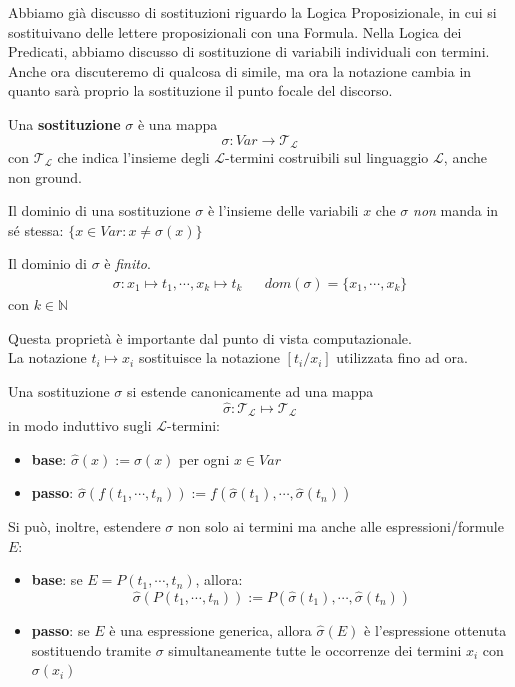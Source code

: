 Abbiamo già discusso di sostituzioni riguardo la Logica Proposizionale, in cui 
si sostituivano delle lettere proposizionali con una Formula. Nella Logica dei Predicati, 
abbiamo discusso di sostituzione di variabili individuali con termini. Anche 
ora discuteremo di qualcosa di simile, ma ora la notazione cambia in quanto 
sarà proprio la sostituzione il punto focale del discorso. 

\begin{defi}[Sostituzione]
Una \textbf{sostituzione} $\sigma$ è una mappa 
$$
\sigma: Var \rightarrow \mathscr{T_L}
$$
con $\mathscr{T_L}$ che indica l'insieme degli $\mathscr{L}$-termini costruibili sul linguaggio $\mathscr{L}$, anche non ground. \
\end{defi}
\begin{defi}
Il dominio di una sostituzione $\sigma$ è l'insieme delle variabili $x$ che $\sigma$ \textit{non} manda in sé stessa: $\{x \in Var : x \neq \sigma(x)\}$
\end{defi}
\begin{pro}
Il dominio di $\sigma$ è \textit{finito}.
\begin{align*}
\sigma: x_1 \mapsto t_1, \cdots, x_k \mapsto t_k &&
dom(\sigma) = \{x_1, \cdots, x_k\}
\end{align*}
con $k \in \mathbb{N}$
\end{pro}
\noindent
Questa proprietà è importante dal punto di vista computazionale. \\
La notazione $t_i \mapsto x_i$ sostituisce la notazione $[t_i/x_i]$ utilizzata fino ad ora. 

\begin{defi}
Una sostituzione $\sigma$ si estende canonicamente ad una mappa 
$$
\hat{\sigma}: \mathscr{T_L} \mapsto \mathscr{T_L}
$$
in modo induttivo sugli $\mathscr{L}$-termini:
\begin{itemize}
  \item \textbf{base}: $\hat{\sigma}(x) := \sigma(x)$ per ogni $x \in Var$
  \item \textbf{passo}: $\hat{\sigma}(f(t_1, \cdots, t_n)) := f(\hat{\sigma}(t_1), \cdots, \hat{\sigma}(t_n))$
\end{itemize}
Si può, inoltre, estendere $\sigma$ non solo ai termini ma anche alle espressioni/formule $E$:
\begin{itemize}
  \item \textbf{base}: se $E = P(t_1, \cdots, t_n)$, allora:
  $$
  \hat{\sigma}(P(t_1, \cdots, t_n)) := P(\hat{\sigma}(t_1), \cdots, \hat{\sigma}(t_n))
  $$
  \item \textbf{passo}: se $E$ è una espressione generica, allora $  \hat{\sigma}(E)$ è l'espressione ottenuta sostituendo tramite $\sigma$ simultaneamente tutte le occorrenze dei termini $x_i$ con $\sigma(x_i)$
\end{itemize}
\end{defi}

